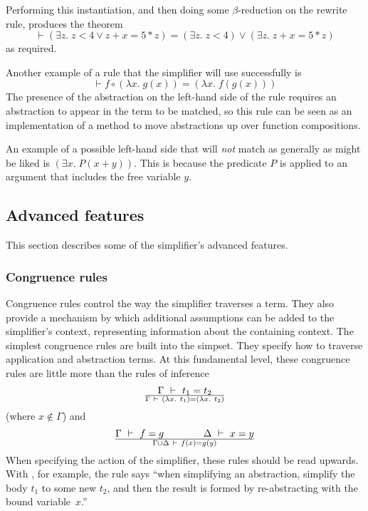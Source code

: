 Performing this instantiation, and then doing some $\beta$-reduction
on the rewrite rule, produces the theorem\[
\vdash (\exists z. \;z < 4 \lor z + x = 5 * z) =
(\exists z. \;z < 4) \lor (\exists z.\;z + x = 5 * z)
\]
as required.

Another example of a rule that the simplifier will use successfully is
\[
\vdash f \circ (\lambda x.\; g(x)) = (\lambda x.\;f(g(x)))
\]
The presence of the abstraction on the left-hand side of the rule
requires an abstraction to appear in the term to be matched, so this
rule can be seen as an implementation of a method to move abstractions
up over function compositions.

An example of a possible left-hand side that will \emph{not} match as
generally as might be liked is $(\exists x.\;P(x + y))$.  This is
because the predicate $P$ is applied to an argument that includes the
free variable $y$.

\subsection{Advanced features}
\label{sec:advanced-simplifier}

This section describes some of the simplifier's advanced features.

\subsubsection{Congruence rules}
\label{sec:simp-congruences}

Congruence rules control the way the simplifier traverses a term.
They also provide a mechanism by which additional assumptions can be
added to the simplifier's context, representing information about the
containing context.  The simplest congruence rules are built into the
 simpset.  They specify how to traverse application and
abstraction terms.  At this fundamental level, these congruence rules
are little more than the rules of inference 
\[
\Gamma \ \vdash\  t_1 = t_2
\over
\Gamma \ \vdash\  (\lambda x.\ t_1) = (\lambda x.\ t_2)
\]
(where $x\not\in\Gamma$) and 
\[
\Gamma \ \vdash\  f = g \qquad \qquad \Delta \ \vdash\  x = y
\over
\Gamma \cup \Delta \ \vdash\  f(x) = g(y)
\]
When specifying the action of the simplifier, these rules should be
read upwards.  With , for example, the rule says ``when
simplifying an abstraction, simplify the body $t_1$ to some new $t_2$,
and then the result is formed by re-abstracting with the bound
variable~$x$.''

